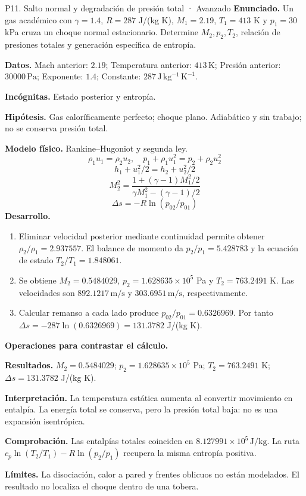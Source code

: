 \begin{studiumworked}{P11. Salto normal y degradación de presión total · Avanzado}
\textbf{Enunciado.} Un gas académico con $\gamma=1.4$, $R=287$ J/(kg K), $M_1=2.19$, $T_1=413$ K y $p_1=30$ kPa cruza un choque normal estacionario. Determine $M_2,p_2,T_2$, relación de presiones totales y generación específica de entropía.

\textbf{Datos.} Mach anterior: $2.19$; Temperatura anterior: $413\,\mathrm{K}$; Presión anterior: $30000\,\mathrm{Pa}$; Exponente: $1.4$; Constante: $287\,\mathrm{J\,kg^{-1}\,K^{-1}}$.

\textbf{Incógnitas.} Estado posterior y entropía.

\textbf{Hipótesis.} Gas caloríficamente perfecto; choque plano. Adiabático y sin trabajo; no se conserva presión total.

\textbf{Modelo físico.} Rankine--Hugoniot y segunda ley.
\[\rho_1u_1=\rho_2u_2,\quad p_1+\rho_1u_1^2=p_2+\rho_2u_2^2\]
\[h_1+u_1^2/2=h_2+u_2^2/2\]
\[M_2^2=\frac{1+(\gamma-1)M_1^2/2}{\gamma M_1^2-(\gamma-1)/2}\]
\[\Delta s=-R\ln(p_{02}/p_{01})\]
\textbf{Desarrollo.}
\begin{enumerate}
\item Eliminar velocidad posterior mediante continuidad permite obtener $\rho_2/\rho_1=2.937557$. El balance de momento da $p_2/p_1=5.428783$ y la ecuación de estado $T_2/T_1=1.848061$.
\item Se obtiene $M_2=0.5484029$, $p_2=1.628635\times10^{5}$ Pa y $T_2=763.2491$ K. Las velocidades son $892.1217\,\mathrm{m/s}$ y $303.6951\,\mathrm{m/s}$, respectivamente.
\item Calcular remanso a cada lado produce $p_{02}/p_{01}=0.6326969$. Por tanto $\Delta s=-287\ln(0.6326969)=131.3782$ J/(kg K).
\end{enumerate}
\textbf{Operaciones para contrastar el cálculo.}

\textbf{Resultados.} $M_2=0.5484029$; $p_2=1.628635\times10^{5}$ Pa; $T_2=763.2491$ K; $\Delta s=131.3782$ J/(kg K).

\textbf{Interpretación.} La temperatura estática aumenta al convertir movimiento en entalpía. La energía total se conserva, pero la presión total baja: no es una expansión isentrópica.

\textbf{Comprobación.} Las entalpías totales coinciden en $8.127991\times10^{5}\,\mathrm{J/kg}$. La ruta $c_p\ln(T_2/T_1)-R\ln(p_2/p_1)$ recupera la misma entropía positiva.

\textbf{Límites.} La disociación, calor a pared y frentes oblicuos no están modelados. El resultado no localiza el choque dentro de una tobera.
\end{studiumworked}
